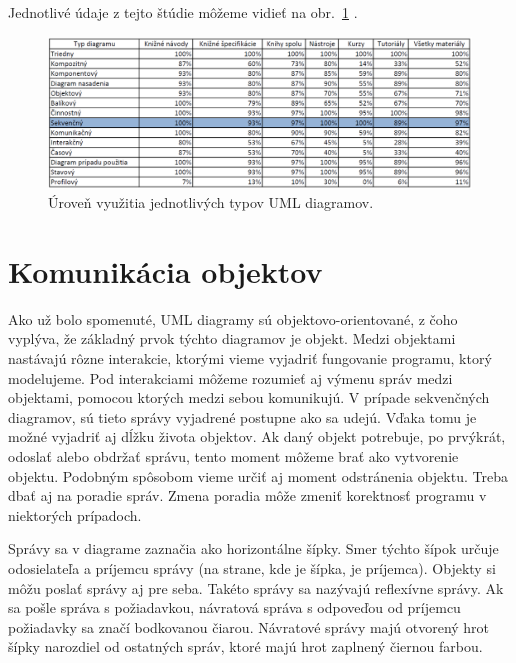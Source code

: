 \documentclass[10pt,slovak,a4paper]{article}
\begin{document}
\noindent Jednotlivé údaje z tejto štúdie môžeme vidieť na obr.~\ref{tab} .

\begin{figure}[tbh]
\centering
\includegraphics[scale=0.5]{tab.pdf}
\caption{Úroveň využitia jednotlivých typov UML diagramov. \cite{reggio13}}
\label{tab}
\end{figure}

\section{Komunikácia objektov} \label{comm}

Ako už bolo spomenuté, UML diagramy sú objektovo-orientované, z čoho vyplýva, že základný prvok týchto diagramov je objekt. 
Medzi objektami nastávajú rôzne interakcie, ktorými vieme vyjadriť fungovanie programu, ktorý modelujeme. 
Pod interakciami môžeme rozumieť aj výmenu správ medzi objektami, pomocou ktorých medzi sebou komunikujú.
V prípade sekvenčných diagramov, sú tieto správy vyjadrené postupne ako sa udejú. Vďaka tomu je možné vyjadriť aj dĺžku života objektov. 
Ak daný objekt potrebuje, po prvýkrát, odoslať alebo obdržať správu, tento moment môžeme brať ako vytvorenie objektu. Podobným spôsobom vieme určiť aj moment odstránenia objektu.   
Treba dbať aj na poradie správ. Zmena poradia môže zmeniť korektnosť programu v niektorých prípadoch. \cite{petraq14} \newline

\noindent Správy sa v diagrame zaznačia ako horizontálne šípky. Smer týchto šípok určuje odosielateľa a
príjemcu správy (na strane, kde je šípka, je príjemca). Objekty si môžu poslať správy aj pre seba. Takéto správy sa nazývajú reflexívne správy. \cite{petraq14} 
Ak sa pošle správa s požiadavkou, návratová správa s odpoveďou od príjemcu požiadavky sa značí bodkovanou čiarou. 
Návratové správy majú otvorený hrot šípky narozdiel od ostatných správ, ktoré majú hrot zaplnený čiernou farbou. \cite{booch00}\newline
\end{document}
